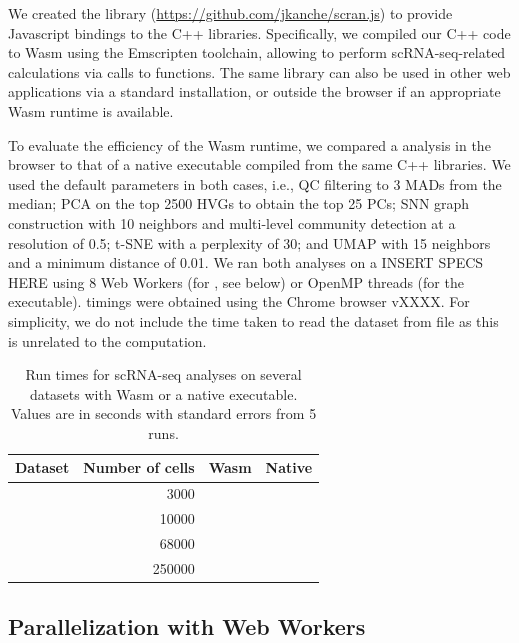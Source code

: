 \documentclass{article}
\begin{document}
We created the  library (\url{https://github.com/jkanche/scran.js}) to provide Javascript bindings to the C++ libraries.
Specifically, we compiled our C++ code to Wasm using the Emscripten toolchain, allowing  to perform scRNA-seq-related calculations via calls to  functions.
The same library can also be used in other web applications via a standard  installation, or outside the browser if an appropriate Wasm runtime is available.

To evaluate the efficiency of the Wasm runtime, we compared a  analysis in the browser to that of a native executable compiled from the same C++ libraries.
We used the default  parameters in both cases, i.e.,
QC filtering to 3 MADs from the median;
PCA on the top 2500 HVGs to obtain the top 25 PCs;
SNN graph construction with 10 neighbors and multi-level community detection at a resolution of 0.5;
t-SNE with a perplexity of 30;
and UMAP with 15 neighbors and a minimum distance of 0.01.
We ran both analyses on a INSERT SPECS HERE using 8 Web Workers (for , see below) or OpenMP threads (for the executable).
 timings were obtained using the Chrome browser vXXXX.
For simplicity, we do not include the time taken to read the dataset from file as this is unrelated to the computation.


\begin{table}
\caption{Run times for scRNA-seq analyses on several datasets with Wasm or a native executable.
Values are in seconds with standard errors from 5 runs.}
\label{tab:times}
\begin{center}
\begin{tabular}{l r r r}
\hline
Dataset & \multicolumn{1}{c}{Number of cells} & \multicolumn{1}{c}{Wasm} & \multicolumn{1}{c}{Native} \\
\hline
 & 3000 \\
 & 10000 \\
 & 68000 \\
 & 250000 \\
\hline
\end{tabular}
\end{center}
\end{table}


\subsection{Parallelization with Web Workers}
\end{document}
